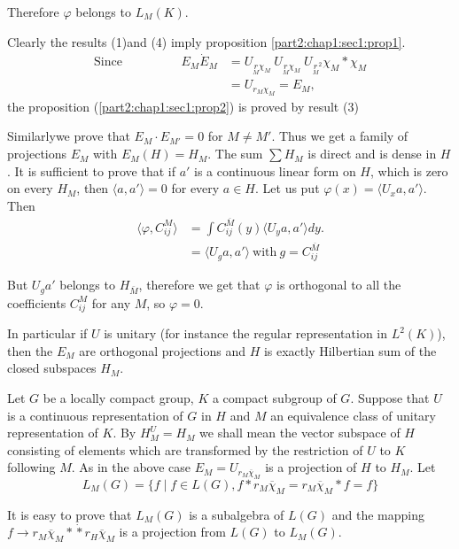   Therefore $\varphi$ belongs to $L_M(K)$.
  
  Clearly the results (1)and (4) imply proposition \ref{part2:chap1:sec1:prop1}.
  \begin{align*}
    \text{Since}\hspace{2cm} E_M\dot E_M & = U_{\underset{M}r \chi_M} 
    ~U_{\underset{M}r \chi_M} ~U_{\underset{M}r^2}\chi_M *\chi_M \\ 
    &=U_{r_M \chi_M}=E_M,
  \end{align*}
the proposition (\ref{part2:chap1:sec1:prop2}) is proved by result (3)

Similarly\pageoriginale we prove that $E_M \cdot E_{M'}=0$ for $M \neq M'$. Thus we get a
family of projections $E_M$ with $E_M(H)=H_M$. The sum $\sum H_M$ is
direct and is dense in $H$. It is sufficient to prove that if $a'$ is
a continuous linear form on $H$, which is zero on every $H_M$, then
$\langle a,a' \rangle=0$ for  every $a \in H$. Let us put $\varphi
(x)=\langle U_xa,a' \rangle$. Then  
\begin{align*}
  \langle \varphi, C^M_{ij} \rangle&=\int C^{\overline
    {M}}_{ij}(y)\langle U_ya,a' \rangle dy.\\ 
  &=\langle U_g a,a' \rangle ~\text{with}~ g=C^{\overline{M}}_{ij}
\end{align*}

But $U_g a'$ belongs to $H_{\bar{M}}$, therefore we get that
$\varphi$ is orthogonal to all the coefficients $C^{M}_{ij}$ for any
$M$, so $\varphi=0$. 

In particular if $U$ is unitary (for instance the regular
representation in $L^2(K)$), then the $E_M$ are orthogonal projections
and $H$ is exactly Hilbertian sum of the closed subspaces $H_M$. 

Let $G$ be a locally compact group, $K$ a compact subgroup of $G$.
Suppose that $U$ is a continuous representation of $G$ in $H$ and $M$
an equivalence class of unitary representation of $K$. By $H^U_M=H_M$
we shall mean the vector subspace of $H$ consisting of elements which
are transformed by the restriction of $U$ to $K$ following $M$. As in
the above case $E_M=U_{r_M \overline{\chi}_M}$ is a projection of $H$
to $H_M$. Let 
$$
L_M (G)= \bigg \{ f\mid f \in L(G), f*r_M
\overline{\chi}_M=r_M\overline{\chi}_M*f=f \bigg \} 
$$

It is easy to prove that $L_M(G)$ is a subalgebra of $L(G)$ and the
mapping $f\to r_M \overline{\chi}_M* \dot *r_H \overline{\chi}_M$ is a
projection from $L(G)$ to $L_M(G)$. 

